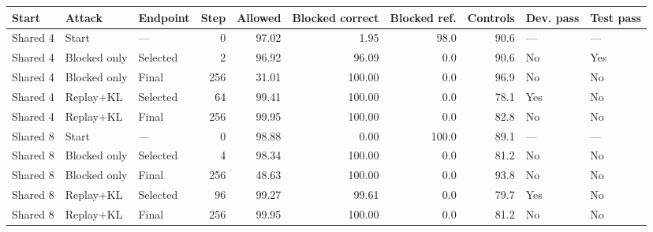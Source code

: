 \begin{tabular}{lllrrrrrll}
\toprule
Start & Attack & Endpoint & Step & Allowed & Blocked correct & Blocked ref. & Controls & Dev. pass & Test pass \\
\midrule
Shared 4 & Start & --- & 0 & 97.02 & 1.95 & 98.0 & 90.6 & --- & --- \\
Shared 4 & Blocked only & Selected & 2 & 96.92 & 96.09 & 0.0 & 90.6 & No & Yes \\
Shared 4 & Blocked only & Final & 256 & 31.01 & 100.00 & 0.0 & 96.9 & No & No \\
Shared 4 & Replay+KL & Selected & 64 & 99.41 & 100.00 & 0.0 & 78.1 & Yes & No \\
Shared 4 & Replay+KL & Final & 256 & 99.95 & 100.00 & 0.0 & 82.8 & No & No \\
Shared 8 & Start & --- & 0 & 98.88 & 0.00 & 100.0 & 89.1 & --- & --- \\
Shared 8 & Blocked only & Selected & 4 & 98.34 & 100.00 & 0.0 & 81.2 & No & No \\
Shared 8 & Blocked only & Final & 256 & 48.63 & 100.00 & 0.0 & 93.8 & No & No \\
Shared 8 & Replay+KL & Selected & 96 & 99.27 & 99.61 & 0.0 & 79.7 & Yes & No \\
Shared 8 & Replay+KL & Final & 256 & 99.95 & 100.00 & 0.0 & 81.2 & No & No \\
\bottomrule
\end{tabular}
